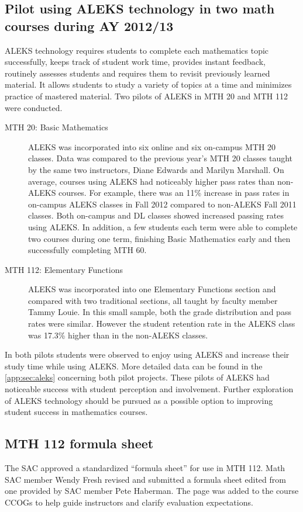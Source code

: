 \subsection[ALEKS pilot]{Pilot using ALEKS technology in two math courses during AY 2012/13}\label{sec3:subset:alekspilot}
ALEKS technology requires students to complete each mathematics topic
successfully, keeps track of student work time, provides instant feedback,
routinely assesses students and requires them to revisit previously learned
material.  It allows students to study a variety of topics at a time and
minimizes practice of mastered material. Two pilots of ALEKS in MTH 20 and MTH
112 were conducted.

\begin{description}
	\item[MTH 20: Basic Mathematics] ALEKS was incorporated into six online and six
	on-campus MTH 20 classes.  Data was compared to the previous year's MTH 20
	classes taught by the same two instructors, Diane Edwards and Marilyn
	Marshall.  On average, courses using ALEKS had noticeably higher pass rates
	than non-ALEKS courses.  For example, there was an 11\% increase in pass rates
	in on-campus ALEKS classes in Fall 2012 compared to non-ALEKS Fall 2011
	classes.  Both on-campus and DL classes showed increased passing rates using
	ALEKS.  In addition, a few students each term were able to complete two
	courses during one term, finishing Basic Mathematics early and then
	successfully completing MTH 60.

	\item[MTH 112: Elementary Functions] ALEKS was incorporated into one Elementary
	Functions section and compared with two traditional sections, all taught by
	faculty member Tammy Louie.  In this small sample, both the grade distribution
	and pass rates were similar.  However the student retention rate in the ALEKS
	class was 17.3\% higher than in the non-ALEKS classes.

\end{description}

In both pilots students were observed to enjoy using ALEKS and increase their
study time while using ALEKS.  More detailed data can be found in the
\vref{app:sec:aleks} concerning both pilot projects. These pilots of ALEKS had
noticeable success with student perception and involvement.  Further
exploration of ALEKS technology should be pursued as a possible option to
improving student success in mathematics courses.

\subsection{MTH 112 formula sheet}
The SAC approved a standardized ``formula sheet'' for use in MTH 112.  Math SAC
member Wendy Fresh revised and submitted a formula sheet edited from one
provided by SAC member Pete Haberman.  The page was added to the course CCOGs to
help guide instructors and clarify evaluation expectations.

